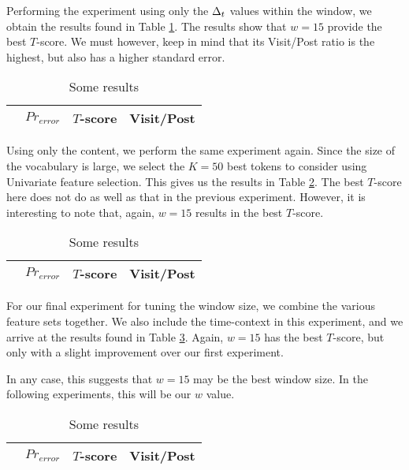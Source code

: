 Performing the experiment using only the $\Delta_t$ values within the window, we 
obtain the results found in Table \ref{tbl:par_tune_dt}. The results show that 
$w=15$ provide the best $T$-score. We must however, keep in mind that its 
Visit/Post ratio is the highest, but also has a higher standard error.

\begin{table}
\begin{center}
\begin{tabular}{| l | c | c | c |}
\hline
		& $Pr_{error}$		  & $T$-score			   &	Visit/Post\\
\hline
	
\hline
\end{tabular}
\end{center}
\caption{Some results}\label{tbl:par_tune_dt}
\end{table}

Using only the content, we perform the same experiment again. Since the size of 
the vocabulary is large, we select the $K = 50$ best tokens to consider using 
Univariate feature selection. This gives us the results in Table 
\ref{tbl:par_tune_content}. The best $T$-score here does not do as well as that 
in the previous experiment. However, it is interesting to note that, again, 
$w=15$ results in the best $T$-score.

\begin{table}
\begin{center}
\begin{tabular}{| l | c | c | c |}
\hline
		& $Pr_{error}$		  & $T$-score			   &	Visit/Post\\
\hline
	
\hline
\end{tabular}
\end{center}
\caption{Some results}\label{tbl:par_tune_content}
\end{table}

For our final experiment for tuning the window size, we combine the various 
feature sets together. We also include the time-context in this experiment, and 
we arrive at the results found in Table \ref{tbl:par_tune_comb}. Again, $w=15$ 
has the best $T$-score, but only with a slight improvement over our first 
experiment.

In any case, this suggests that $w=15$ may be the best window size. In the 
following experiments, this will be our $w$ value.

\begin{table}
\begin{center}
\begin{tabular}{| l | c | c | c |}
\hline
		& $Pr_{error}$		  & $T$-score			   &	Visit/Post\\
\hline
	
\hline
\end{tabular}
\end{center}
\caption{Some results}\label{tbl:par_tune_comb}
\end{table}


